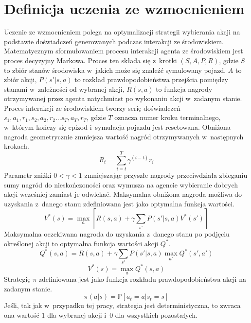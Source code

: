 \documentclass[12pt, oneside]{article}
\begin{document}
\section{Definicja uczenia ze wzmocnieniem}
Uczenie ze wzmocnieniem polega na optymalizacji strategii wybierania akcji na podstawie doświadczeń generowanych podczas interakcji ze środowiskiem. Matematycznym sformułowaniem procesu interakcji agenta ze środowiskiem jest proces decyzyjny Markowa. Proces ten składa się z~krotki $(S, A, P, R)$, gdzie $S$ to zbiór stanów środowiska w~jakich może się znaleźć symulowany pojazd, $A$ to zbiór akcji, $P(s'|s,a)$ to rozkład prawdopodobieństwa przejścia pomiędzy stanami w~zależności od wybranej akcji, $R(s,a)$ to funkcja nagrody otrzymywanej przez agenta natychmiast po wykonaniu akcji w~zadanym stanie.
Proces interakcji ze środowiskiem tworzy serię doświadczeń $s_1, a_1, r_1, s_2, a_2, r_2 ... s_T, a_T, r_T$, gdzie $T$ oznacza numer kroku terminalnego, w~którym kończy się epizod i~symulacja pojazdu jest resetowana.
Obniżona nagroda geometrycznie zmniejsza wartość nagród otrzymywanych w~następnych krokach. 
\begin{equation}
R_t=\sum^T_{i=t} \gamma^{(i-t)}r_i
\end{equation}
Parametr zniżki $0<\gamma<1$ zmniejszając przyszłe nagrody przeciwdziała zbieganiu sumy nagród do nieskończoności oraz wymusza na agencie wybieranie dobrych akcji wcześniej zamiast je odwlekać.
Maksymalna obniżona nagroda możliwa do uzyskania z~danego stanu zdefiniowana jest jako optymalna funkcja wartości.
\begin{equation}
V^*(s)=\max_a[R(s,a)+ \gamma \sum_{s'}P(s'|s,a)V^*(s')]
\end{equation}
Maksymalna oczekiwana nagroda do uzyskania z~danego stanu po podjęciu określonej akcji to optymalna funkcja wartości akcji $Q^*$. 
\begin{equation}
Q^*(s,a)=R(s,a)+ \gamma \sum_{s'}P(s'|s,a) \max_{a'} Q^*(s',a')
\end{equation}
\begin{equation*}
V^*(s)= \max_a Q^*(s,a)
\end{equation*}
Strategię $\pi$ zdefiniowana jest jako funkcja rozkładu prawdopodobieństwa akcji na zadanym stanie. 
\begin{equation}
\pi(a|s)=\mathbb{P}[a_t=a|s_t=s]
\end{equation} 
Jeśli, tak jak w~przypadku tej pracy, strategia jest deterministyczna, to zwraca ona wartość $1$ dla wybranej akcji i~$0$ dla wszystkich pozostałych.
\end{document}
